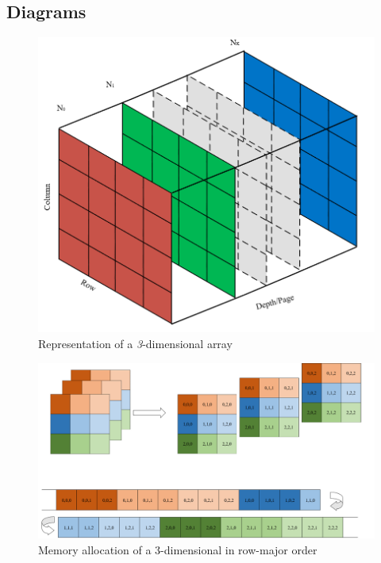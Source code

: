 \documentclass[10pt, conference]{IEEEtran}
\begin{document}
\onecolumn
\center
\begin{appendices}
\section{Diagrams}
\label{Diagrams}

\begin{figure}[h!]
\renewcommand{\thefigure}{\arabic{figure}}
\centering
\includegraphics[scale=0.4]{DimensionalArray.png}
\caption{Representation of a \emph{3}-dimensional array}
\label{DimArray}
\end{figure}

\begin{figure}[h!]
\renewcommand{\thefigure}{\arabic{figure}}
\centering
\includegraphics[scale=0.5]{MemoryAlloc.png}
\caption{Memory allocation of a 3-dimensional in row-major order~\cite{Eli}}
\label{3DArray}
\end{figure}


\end{appendices}
\end{document}
